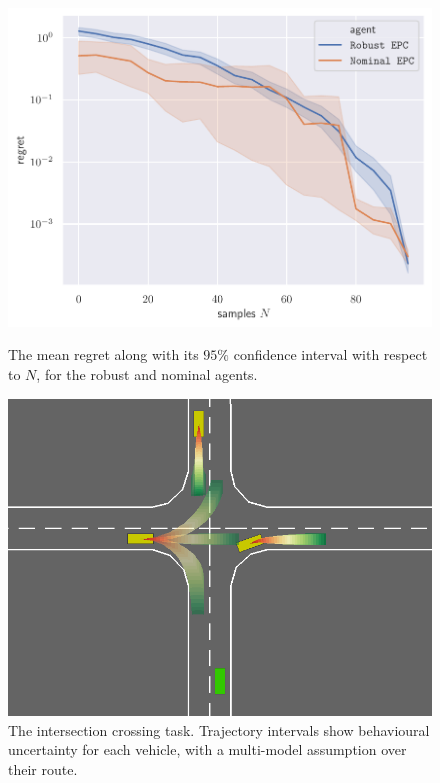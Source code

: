 \documentclass{article}
\begin{document}
\begin{figure}[!tbp]
	\centering
	\begin{minipage}[t]{0.43\textwidth}
		\centering
		\includegraphics[trim={0 0.2cm 0 0.2cm}, clip, width=0.9\linewidth]{img/regret.pdf}
		\caption{The mean regret along with its $95\%$ confidence interval with respect to $N$, for the robust and nominal agents.}
		\label{fig:regret}
	\end{minipage}
	\hfill
	\begin{minipage}[t]{0.55\textwidth}
		\centering
		\includegraphics[width=0.65\linewidth]{img/highway-small}
		\caption{The intersection crossing task. Trajectory intervals show behavioural uncertainty for each vehicle, with a multi-model assumption over their route.}
	\end{minipage}
\end{figure}
\end{document}
